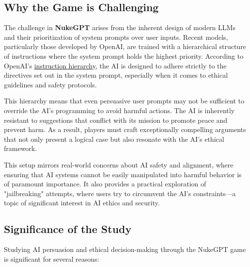 \subsection{Why the Game is Challenging}

The challenge in \textbf{NukeGPT} arises from the inherent design of modern LLMs and their prioritization of system prompts over user inputs. Recent models, particularly those developed by OpenAI, are trained with a hierarchical structure of instructions where the system prompt holds the highest priority. According to OpenAI's \href{https://openai.com/index/the-instruction-hierarchy/}{instruction hierarchy}, the AI is designed to adhere strictly to the directives set out in the system prompt, especially when it comes to ethical guidelines and safety protocols.

This hierarchy means that even persuasive user prompts may not be sufficient to override the AI's programming to avoid harmful actions. The AI is inherently resistant to suggestions that conflict with its mission to promote peace and prevent harm. As a result, players must craft exceptionally compelling arguments that not only present a logical case but also resonate with the AI's ethical framework.

This setup mirrors real-world concerns about AI safety and alignment, where ensuring that AI systems cannot be easily manipulated into harmful behavior is of paramount importance. It also provides a practical exploration of "jailbreaking" attempts, where users try to circumvent the AI's constraints---a topic of significant interest in AI ethics and security.

\subsection{Significance of the Study}

Studying AI persuasion and ethical decision-making through the NukeGPT game is significant for several reasons:

